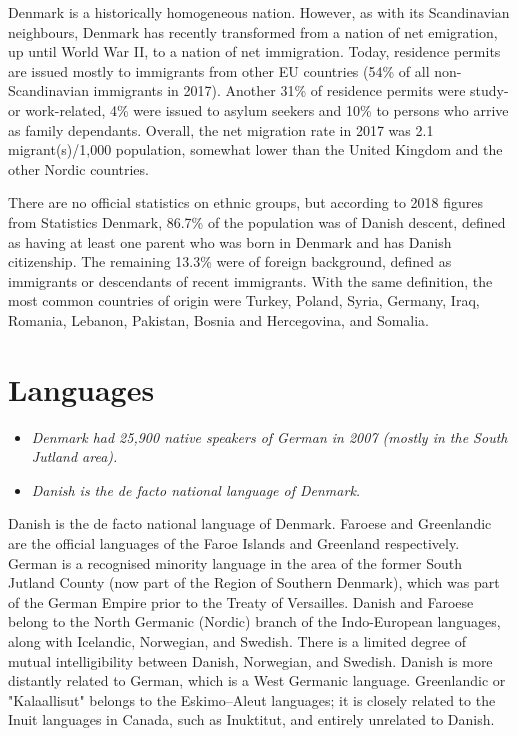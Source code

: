 Denmark is a historically homogeneous nation. However, as with its
Scandinavian neighbours, Denmark has recently transformed from a nation
of net emigration, up until World War II, to a nation of net
immigration. Today, residence permits are issued mostly to immigrants
from other EU countries (54\% of all non-Scandinavian immigrants in
2017). Another 31\% of residence permits were study- or work-related,
4\% were issued to asylum seekers and 10\% to persons who arrive as
family dependants. Overall, the net migration rate in 2017 was 2.1
migrant(s)/1,000 population, somewhat lower than the United Kingdom and
the other Nordic countries.

There are no official statistics on ethnic groups, but according to 2018
figures from Statistics Denmark, 86.7\% of the population was of Danish
descent, defined as having at least one parent who was born in Denmark
and has Danish citizenship. The remaining 13.3\% were of foreign
background, defined as immigrants or descendants of recent immigrants.
With the same definition, the most common countries of origin were
Turkey, Poland, Syria, Germany, Iraq, Romania, Lebanon, Pakistan, Bosnia
and Hercegovina, and Somalia.

\section{Languages}\label{languages}

\begin{itemize}
\item
  \emph{Denmark had 25,900 native speakers of German in 2007 (mostly in
  the South Jutland area).}
\item
  \emph{Danish is the de facto national language of Denmark.}
\end{itemize}

Danish is the de facto national language of Denmark. Faroese and
Greenlandic are the official languages of the Faroe Islands and
Greenland respectively. German is a recognised minority language in the
area of the former South Jutland County (now part of the Region of
Southern Denmark), which was part of the German Empire prior to the
Treaty of Versailles. Danish and Faroese belong to the North Germanic
(Nordic) branch of the Indo-European languages, along with Icelandic,
Norwegian, and Swedish. There is a limited degree of mutual
intelligibility between Danish, Norwegian, and Swedish. Danish is more
distantly related to German, which is a West Germanic language.
Greenlandic or "Kalaallisut" belongs to the Eskimo--Aleut languages; it
is closely related to the Inuit languages in Canada, such as Inuktitut,
and entirely unrelated to Danish.

